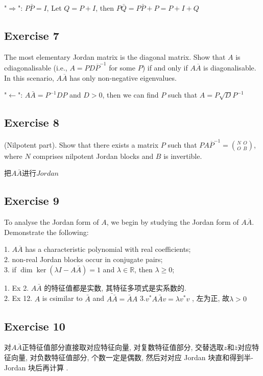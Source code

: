 \documentclass[11pt]{ctexart}
\theoremstyle{definition}
\numberwithin{equation}{section}
\theoremstyle{definition}
\theoremstyle{remark}
\begin{document}
\begin{aaa}
    "$\Rightarrow$":  $P\bar{P}=I$, Let $Q=P+I$, then $ P\bar{Q}=P\bar{P}+P=P+I+Q$
\end{aaa}
\subsection{Exercise 7}
The most elementary Jordan matrix is the diagonal matrix. Show that $A$ is cdiagonalisable (i.e., $A = PD\overline P^{-1}$ for some $P$) if and only if $A\overline A$ is diagonalisable. In this scenario, $A\overline A$ has only non-negative eigenvalues.\
\begin{aaa}
    "$\leftarrow$": $A\bar{A}=P^{-1}DP$ and $D>0$, then we can find $P$ such that $A=P\sqrt{D}P^{-1}$\\
\end{aaa}
\subsection{Exercise 8}
(Nilpotent part). Show that there exists a matrix $P$ such that $PA\overline P^{-1} = \binom{N \ \ O}{O \ \ B}$, where $N$ comprises nilpotent Jordan blocks and $B$ is invertible.
\begin{aaa}
    把$A\bar{A}$进行$Jordan$
\end{aaa}
\subsection{Exercise 9}
To analyse the Jordan form of $A$, we begin by studying the Jordan form of $A \overline A$. Demonstrate the following:

1. $A \overline A$ has a characteristic polynomial with real coefficients;\\
2. non-real Jordan blocks occur in conjugate pairs;\\
3. if $\dim \ker (\lambda I - A\overline A) = 1$ and $\lambda \in \mathbb R$, then $\lambda \geq 0$;
\begin{aaa}
    1. Ex 2. $A\bar{A}$ 的特征值都是实数, 其特征多项式是实系数的.\\
    2. Ex 12. $A$ is csimilar to $\bar{A}$ and $\bar{A\bar{A}}=\bar{A}A$
    3.$v^*A\bar{A}v=\lambda v^*v$ , 左为正, 故$\lambda >0$
\end{aaa}
\subsection{Exercise 10}
\begin{aaa}
    对$A\bar{A}$正特征值部分直接取对应特征向量, 对复数特征值部分, 交替选取$z$和$\bar{z}$对应特征向量, 对负数特征值部分, 个数一定是偶数, 然后对对应 Jordan 块直和得到半-Jordan 块后再计算 .
\end{aaa}
\end{document}
